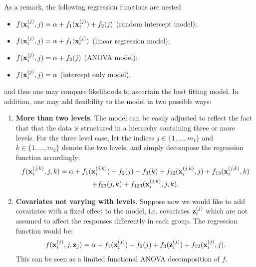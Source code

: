 As a remark, the following regression functions are nested 
\begin{itemize}
  \item $f({\mathbf x}_i^{(j)}, j) = \alpha + f_1({\mathbf x}_i^{(j)}) + f_2(j)$ (random intercept model);  %
  \item $f({\mathbf x}_i^{(j)}, j) = \alpha + f_1({\mathbf x}_i^{(j)})$ (linear regression model);
  \item $f({\mathbf x}_i^{(j)}, j) = \alpha + f_2(j)$ (ANOVA model);
  \item $f({\mathbf x}_i^{(j)}, j) = \alpha$ (intercept only model),
\end{itemize}
and thus one may compare likelihoods to ascertain the best fitting model.
In addition, one may add flexibility to the model in two possible ways:
\begin{enumerate}
  \item \textbf{More than two levels}. The model can be easily adjusted to reflect the fact that that the data is structured in a hierarchy containing three or more levels. For the three level case, let the indices $j\in\{1,\dots,m_1\}$ and $k\in\{1,\dots,m_2\}$ denote the two levels, and simply decompose the regression function accordingly:
  \begin{align*}
    \begin{gathered}
      f({\mathbf x}_i^{(j,k)}, j, k) = \alpha + f_1({\mathbf x}_i^{(j,k)}) + f_2(j) + f_3(k) + f_{12}({\mathbf x}_i^{(j,k)}, j) + f_{13}({\mathbf x}_i^{(j,k)}, k)\\ 
      + f_{23}(j, k) + f_{123}({\mathbf x}_i^{(j,k)}, j, k).
    \end{gathered}
  \end{align*}
  \item \textbf{Covariates not varying with levels}. Suppose now we would like to add covariates with a fixed effect to the model, i.e. covariates ${\mathbf z}_i^{(j)}$ which are not assumed to affect the responses differently in each group. The regression function would be:
  \begin{align*}
    \begin{gathered}
      f({\mathbf x}_i^{(j)}, j, {\mathbf z}_j) = \alpha + f_1({\mathbf x}_i^{(j)}) + f_2(j) + f_3({\mathbf z}_i^{(j)}) + f_{12}({\mathbf x}_i^{(j)}, j).
    \end{gathered}
  \end{align*}
  This can be seen as a limited functional ANOVA decomposition of $f$.
\end{enumerate}

